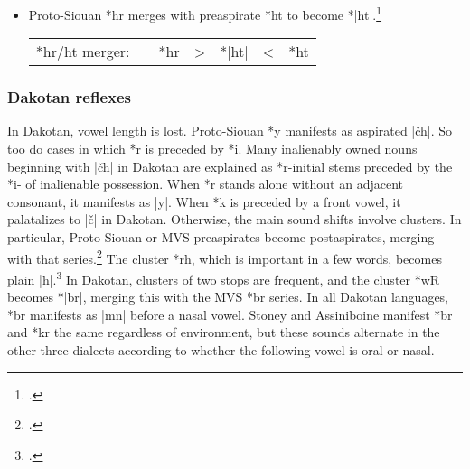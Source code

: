 \documentclass[output=paper]{LSP/langsci}
\begin{document}
\begin{itemize}
\item Proto-Siouan *hr merges with preaspirate *ht to become *|ht|.\footnote{\citealt[199]{Rankinetal2006PDF}.}


\begin{tabular}[t]{c c c c c c c }
*hr/ht merger: & &*hr & > & *|ht| & < & *ht
\end{tabular}
\end{itemize}

\subsubsection{Dakotan reflexes}

In Dakotan, vowel length is lost.  Proto-Siouan *y manifests as aspirated |\v{c}h|.  So too do cases in which *r is preceded by *i.  Many inalienably owned nouns beginning with |\v{c}h| in Dakotan are explained as *r-initial stems preceded by the *i- of inalienable possession.  When *r stands alone without an adjacent consonant, it manifests as |y|.  When *k is preceded by a front vowel, it palatalizes to |\v{c}| in Dakotan.  Otherwise, the main sound shifts involve clusters.  In particular, Proto-Siouan or MVS preaspirates become postaspirates, merging with that series.\footnote{\citealt[199, 269, 818]{Rankinetal2006PDF}.} The cluster *rh, which is important in a few words, becomes plain |h|.\footnote{\citealt[165]{Rankinetal2006PDF}.} In Dakotan, clusters of two stops are frequent, and the cluster *wR becomes *|br|, merging this with the MVS *br series. In all Dakotan languages, *br manifests as |mn| before a nasal vowel.  Stoney and Assiniboine manifest *br and *kr the same regardless of environment, but these sounds alternate in the other three dialects according to whether the following vowel is oral or nasal.
\end{document}
